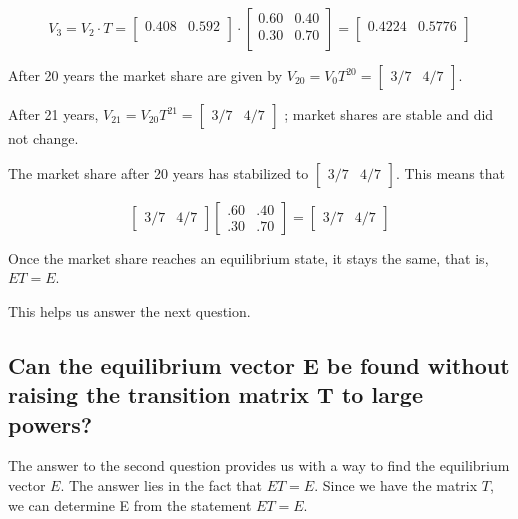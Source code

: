 \[
    V_3 = V_2 \cdot T = \begin{bmatrix}
        0.408 & 0.592 \\
    \end{bmatrix} \cdot \begin{bmatrix}
        0.60 & 0.40 \\
        0.30 & 0.70 \\
    \end{bmatrix} = \begin{bmatrix}
        0.4224 & 0.5776 \\
    \end{bmatrix}
\]


After 20 years the market share are given by \( V_{20} = V_0 T^{20}  = \begin{bmatrix}
    3/7 & 4/7
\end{bmatrix} \).

After 21 years, \( V_{21} = V_{20} T^{21}  = \begin{bmatrix}
    3/7 & 4/7
\end{bmatrix}\) ; market shares are stable and did not change.

The market share after 20 years has stabilized to \( \begin{bmatrix}
    3/7 & 4/7
\end{bmatrix} \). This means that

\[
    \begin{bmatrix}
        3/7 & 4/7
    \end{bmatrix}
    \begin{bmatrix}
        .60 & .40 \\
        .30 & .70
    \end{bmatrix} = \begin{bmatrix}
        3/7 & 4/7
    \end{bmatrix}
\]

Once the market share reaches an equilibrium state, it stays the same, that is, \( ET = E \).

This helps us answer the next question.

\subsection{Can the equilibrium vector E be found without raising the transition matrix T to large powers?}

The answer to the second question provides us with a way to find the equilibrium vector $E$. The answer lies in the fact that $ET = E$. Since we have the matrix $T$, we can determine E from the statement $ET = E$.

